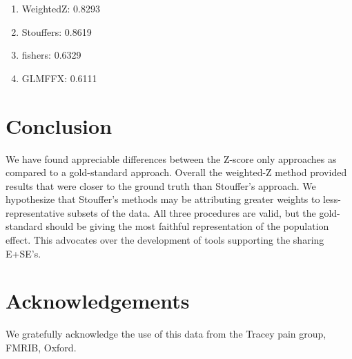 \documentclass{llncs}
\begin{document}
\begin{enumerate}
\item  WeightedZ: 0.8293
\item  Stouffers: 0.8619
\item  fishers: 0.6329
\item  GLMFFX: 0.6111
\end{enumerate}
    

         
       
          
       
    
       

\section{Conclusion}
We have found appreciable differences between the Z-score only approaches as compared to a gold-standard approach. Overall the weighted-Z method provided results that were closer to the ground truth than Stouffer's approach. We hypothesize that Stouffer's methods may be attributing greater weights to less-representative subsets of the data. All three procedures are valid, but the gold-standard should be giving the most faithful representation of the population effect. This advocates over the development of tools supporting the sharing E+SE's.

\section{Acknowledgements}
We gratefully acknowledge the use of this data from the Tracey pain group, FMRIB, Oxford.

%








\end{document}

